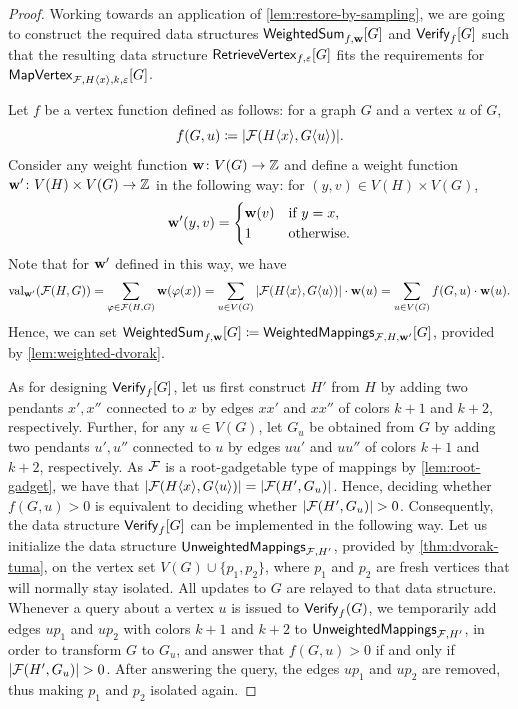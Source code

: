 \begin{proof}
	Working towards an application of \cref{lem:restore-by-sampling}, we are going to construct the required data structures $\mathsf{WeightedSum}_{f, \mathbf{w}}[G]$ and $\mathsf{Verify}_f[G]$ such that the resulting data structure $\mathsf{RetrieveVertex}_{f,\varepsilon}[G]$ fits the requirements for $\mathsf{MapVertex}_{\mathcal{F}, H\langle x\rangle, k,\varepsilon}[G]$.
		
	Let $f$ be a vertex function defined as follows: for a graph $G$ and a vertex $u$ of $G$, 
	\[f(G,u)\coloneqq |\mathcal{F}(H\langle x\rangle,G\langle u\rangle)|.\] 
	Consider any weight function $\mathbf{w}\colon V(G)\to \mathbb{Z}$ and define a weight function $\mathbf{w}' \colon V(H) \times V(G) \to \mathbb{Z}$ in the following way: for $(y,v)\in V(H)\times V(G)$,
	\[
	\mathbf{w}'(y,v) =
	\begin{cases}
		\mathbf{w}(v) & \text{if } y = x, \\
		1  & \text{otherwise.}
	\end{cases}
	\]
	Note that for $\mathbf{w}'$ defined in this way, we have  \[\mathrm{val}_{\mathbf{w}'}(\mathcal{F}(H, G)) =\sum_{\varphi\in \mathcal{F}(H,G)} \mathbf{w}(\varphi(x)) = \sum_{u\in V(G)} |\mathcal{F}(H\langle x\rangle,G\langle u\rangle)|\cdot \mathbf{w}(u)= \sum_{u \in V(G)} f(G, u)\cdot \mathbf{w}(u).\]
	Hence, we can set $\mathsf{WeightedSum}_{f, \mathbf{w}}[G] \coloneqq \mathsf{WeightedMappings}_{\mathcal{F}, H, \mathbf{w}'}[G]$, provided by \cref{lem:weighted-dvorak}.
	
	As for designing $\mathsf{Verify}_f[G]$, let us first construct $H'$ from $H$ by adding two pendants $x',x''$ connected to $x$ by edges $xx'$ and $xx''$ of colors $k+1$ and $k+2$, respectively. Further, for any $u \in V(G)$, let $G_u$ be obtained from $G$ by adding two pendants $u',u''$ connected to $u$ by edges $uu'$ and $uu''$ of colors $k+1$ and $k+2$, respectively. As $\mathcal{F}$ is a root-gadgetable type of mappings by \cref{lem:root-gadget}, we have that $|\mathcal{F}(H\langle x\rangle, G\langle u\rangle)|=|\mathcal{F}(H',G_u)|$. Hence, deciding whether $f(G, u)>0$ is equivalent to deciding whether $|\mathcal{F}(H', G_u)| > 0$. Consequently, the data structure $\mathsf{Verify}_f[G]$ can be implemented in the following way. Let us initialize the data structure $\mathsf{UnweightedMappings}_{\mathcal{F}, H'}$, provided by \cref{thm:dvorak-tuma}, on the vertex set $V(G) \cup \{p_1, p_2\}$, where $p_1$ and $p_2$ are fresh vertices that will normally stay isolated. All updates to $G$ are relayed to that data structure. Whenever a query about a vertex $u$ is issued to $\mathsf{Verify}_f(G)$, we temporarily add edges $up_1$ and $up_2$ with colors $k+1$ and $k+2$ to $\mathsf{UnweightedMappings}_{\mathcal{F}, H'}$, in order to transform $G$ to $G_u$, and answer that $f(G, u)>0$ if and only if $|\mathcal{F}(H', G_u)| > 0$. After answering the query, the edges $up_1$ and $up_2$ are removed, thus making $p_1$ and $p_2$ isolated again.
	

\end{proof}
